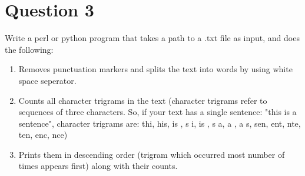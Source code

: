 \documentclass[11pt,a4paper]{article}
\begin{document}
\section*{Question 3}
Write a perl or python program that takes a path to a .txt file as input, and does the following:
\begin{enumerate}
\item Removes punctuation markers and splits the text into words by using white space seperator.
\item Counts all character trigrams in the text (character trigrams refer to sequences of three characters. So, if your text has a single sentence: "this is a sentence", character trigrams are: thi, his, is , s i, is , s a,  a , a s, sen, ent, nte, ten, enc, nce) 
\item Prints them in descending order (trigram which occurred most number of times appears first) along with their counts. 
\end{enumerate}
\end{document}
